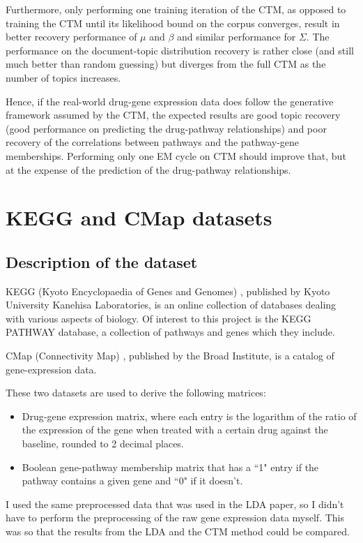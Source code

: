 \documentclass[12pt,a4paper,twoside,openright]{report}
\begin{document}
Furthermore, only performing one training iteration of the CTM, as opposed to training the CTM until its likelihood bound on the corpus converges, result in better recovery performance of $\mu$ and $\beta$ and similar performance for $\Sigma$. The performance on the document-topic distribution recovery is rather close (and still much better than random guessing) but diverges from the full CTM as the number of topics increases.

Hence, if the real-world drug-gene expression data does follow the generative framework assumed by the CTM, the expected results are good topic recovery (good performance on predicting the drug-pathway relationships) and poor recovery of the correlations between pathways and the pathway-gene memberships. Performing only one EM cycle on CTM should improve that, but at the expense of the prediction of the drug-pathway relationships.

\section{KEGG and CMap datasets}

\subsection{Description of the dataset}

KEGG (Kyoto Encyclopaedia of Genes and Genomes) \cite{KEGG}, published by Kyoto University Kanehisa Laboratories, is an online collection of databases dealing with various aspects of biology. Of interest to this project is the KEGG PATHWAY database, a collection of pathways and genes which they include.

CMap (Connectivity Map) \cite{CMap}, published by the Broad Institute, is a catalog of gene-expression data.

These two datasets are used to derive the following matrices:

\begin{itemize}[noitemsep]
\item Drug-gene expression matrix, where each entry is the logarithm of the ratio of the expression of the gene when treated with a certain drug against the baseline, rounded to 2 decimal places.
\item Boolean gene-pathway membership matrix that has a ``1" entry if the pathway contains a given gene and ``0" if it doesn't.
\end{itemize}

I used the same preprocessed data that was used in the LDA paper, so I didn't have to perform the preprocessing of the raw gene expression data myself. This was so that the results from the LDA and the CTM method could be compared.
\end{document}

